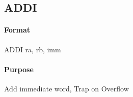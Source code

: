 \subsection{ADDI}


\paragraph{Format} ADDI ra, rb, imm

\paragraph{Purpose} Add immediate word, Trap on Overflow